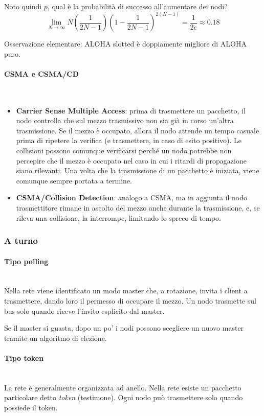\documentclass[12pt,a4paper]{article}
\begin{document}
Noto quindi $p$, qual è la probabilità di successo all'aumentare dei nodi?
$$ \lim_{N\to\infty} N\left(\frac{1}{2N-1}\right)\left(1-\frac{1}{2N-1}\right)^{2(N-1)} = \frac{1}{2e} \approx 0.18 $$

Osservazione elementare: ALOHA slotted è doppiamente migliore di ALOHA puro.

\paragraph{CSMA e CSMA/CD}\mbox{}\\
\begin{itemize}
  \item \textbf{Carrier Sense Multiple Access}: prima di trasmettere un
  pacchetto, il nodo controlla che sul mezzo trasmissivo non sia già in
  corso un'altra trasmissione. Se il mezzo è occupato, allora il nodo
  attende un tempo casuale prima di ripetere la verifica (e
  trasmettere, in caso di esito positivo). Le collisioni possono
  comunque verificarsi perché un nodo potrebbe non percepire che il
  mezzo è occupato nel caso in cui i ritardi di propagazione siano
  rilevanti. Una volta che la trasmissione di un pacchetto è iniziata,
  viene comunque sempre portata a termine.
  \item \textbf{CSMA/Collision Detection}: analogo a CSMA, ma in
  aggiunta il nodo trasmettitore rimane in ascolto del mezzo anche
  durante la trasmissione, e, se rileva una collisione, la interrompe,
  limitando lo spreco di tempo.
\end{itemize}
\subsubsection{A turno}
\paragraph{Tipo polling}\mbox{}\\
Nella rete viene identificato un modo master che, a rotazione, invita i
client a trasmettere, dando loro il permesso di occupare il mezzo. Un
nodo trasmette sul bus solo quando riceve l'invito esplicito dal
master.

Se il master si guasta, dopo un po' i nodi possono scegliere un nuovo
master tramite un algoritmo di elezione.

\paragraph{Tipo token}\mbox{}\\
La rete è generalmente organizzata ad anello. Nella rete esiste un
pacchetto particolare detto \emph{token} (testimone). Ogni nodo può
trasmettere solo quando possiede il token.
\end{document}
